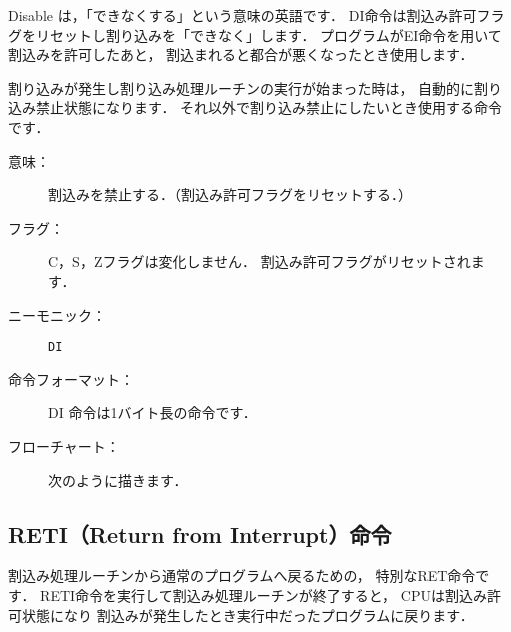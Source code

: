 Disable は，「できなくする」という意味の英語です．
DI命令は割込み許可フラグをリセットし割り込みを「できなく」します．
プログラムがEI命令を用いて割込みを許可したあと，
割込まれると都合が悪くなったとき使用します．

割り込みが発生し割り込み処理ルーチンの実行が始まった時は，
自動的に割り込み禁止状態になります．
それ以外で割り込み禁止にしたいとき使用する命令です．

\begin{description}
\item[意味：]割込みを禁止する．（割込み許可フラグをリセットする．）

\item[フラグ：]C，S，Zフラグは変化しません．
割込み許可フラグがリセットされます．

\item[ニーモニック：] {\tt DI}

\item[命令フォーマット：]DI 命令は1バイト長の命令です．


\item[フローチャート：]
次のように描きます．

\begin{center}
\end{center}

\end{description}

\subsection{RETI（Return from Interrupt）命令}

割込み処理ルーチンから通常のプログラムへ戻るための，
特別なRET命令です．
RETI命令を実行して割込み処理ルーチンが終了すると，
CPUは割込み許可状態になり
割込みが発生したとき実行中だったプログラムに戻ります．


